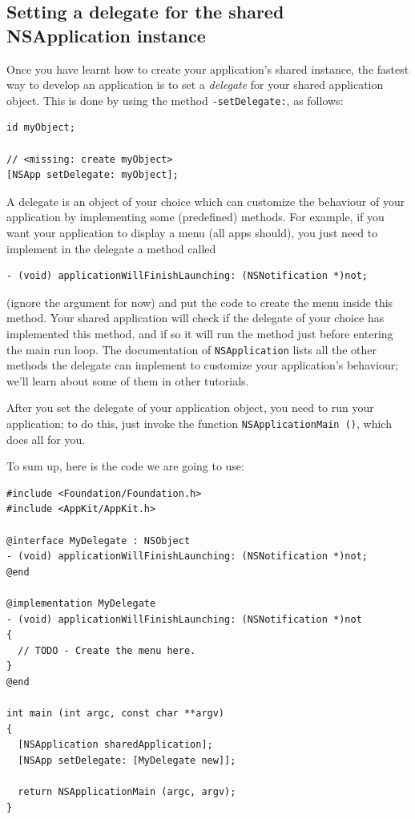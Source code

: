 \documentclass[a4paper]{article}
\begin{document}
\subsection{Setting a delegate for the shared NSApplication instance}
Once you have learnt how to create your application's shared instance,
the fastest way to develop an application is to set a \emph{delegate}
for your shared application object.  This is done by using the method
\texttt{-setDelegate:}, as follows:
\begin{verbatim}
id myObject;

// <missing: create myObject>
[NSApp setDelegate: myObject];
\end{verbatim}
A delegate is an object of your choice which can customize the
behaviour of your application by implementing some (predefined)
methods.  For example, if you want your application to display a menu
(all apps should), you just need to implement in the delegate a method
called
\begin{verbatim}
- (void) applicationWillFinishLaunching: (NSNotification *)not;
\end{verbatim}
(ignore the argument for now) and put the code to create the menu
inside this method.  Your shared application will check if the
delegate of your choice has implemented this method, and if so it will
run the method just before entering the main run loop.  The
documentation of \texttt{NSApplication} lists all the other methods
the delegate can implement to customize your application's behaviour;
we'll learn about some of them in other tutorials.

After you set the delegate of your application object, you need to run
your application; to do this, just invoke the function
\texttt{NSApplicationMain ()}, which does all for you.

To sum up, here is the code we are going to use: 
\begin{verbatim}
#include <Foundation/Foundation.h>
#include <AppKit/AppKit.h>

@interface MyDelegate : NSObject
- (void) applicationWillFinishLaunching: (NSNotification *)not;
@end

@implementation MyDelegate
- (void) applicationWillFinishLaunching: (NSNotification *)not
{
  // TODO - Create the menu here.
}
@end

int main (int argc, const char **argv)
{ 
  [NSApplication sharedApplication];
  [NSApp setDelegate: [MyDelegate new]];

  return NSApplicationMain (argc, argv);
}
\end{verbatim}
\end{document}
